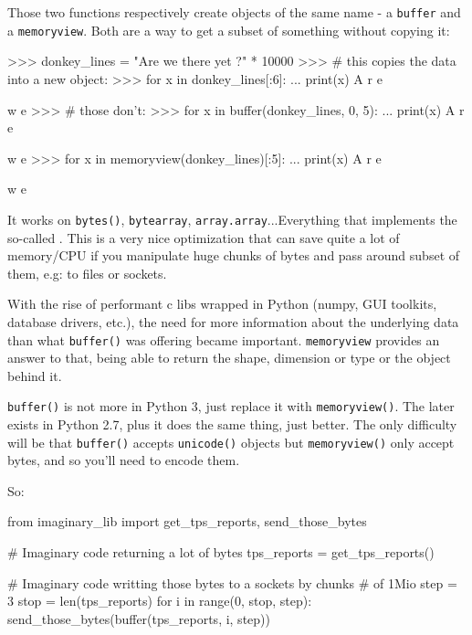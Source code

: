 Those two functions respectively create objects of the same name - a \lstinline{buffer} and a \lstinline{memoryview}. Both are a way to get a subset of something without copying it:

\begin{py2}
>>> donkey_lines = "Are we there yet ?\n" * 10000
>>> # this copies the data into a new object:
>>> for x in donkey_lines[:6]:
...    print(x)
A
r
e

w
e
>>> # those don't:
>>> for x in buffer(donkey_lines, 0, 5):
...    print(x)
A
r
e

w
e
>>> for x in memoryview(donkey_lines)[:5]:
...    print(x)
A
r
e

w
e
\end{py2}

It works on \lstinline{bytes()}, \lstinline{bytearray}, \lstinline{array.array}...Everything that implements the so-called . This is a very nice optimization that can save quite a lot of memory/CPU if you manipulate huge chunks of bytes and pass around subset of them, e.g: to files or sockets.

With the rise of performant c libs wrapped in Python (numpy, GUI toolkits, database drivers, etc.), the need for more information about the underlying data than what \lstinline{buffer()} was offering became important. \lstinline{memoryview} provides an answer to that, being able to return the shape, dimension or type or the object behind it.

\lstinline{buffer()} is not more in Python 3, just replace it with \lstinline{memoryview()}. The later exists in Python 2.7, plus it does the same thing, just better. The only difficulty will be that \lstinline{buffer()} accepts \lstinline{unicode()} objects but \lstinline{memoryview()} only accept bytes, and so you'll need to encode them.

So:

\begin{py2}
from imaginary_lib import get_tps_reports, send_those_bytes

# Imaginary code returning a lot of bytes
tps_reports = get_tps_reports()

# Imaginary code writting those bytes to a sockets by chunks
# of 1Mio
step = 3
stop = len(tps_reports)
for i in range(0, stop, step):
    send_those_bytes(buffer(tps_reports, i, step))

\end{py2}
